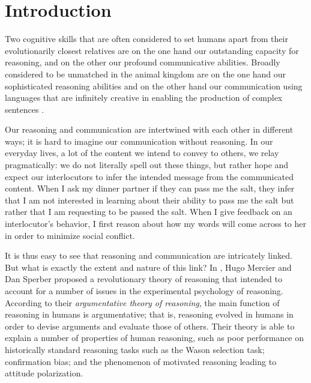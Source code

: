 \chapter*{Introduction}
\label{sec:introduction}


Two cognitive skills that are often considered to set humans apart from their evolutionarily closest relatives are on the one hand our outstanding capacity for reasoning, and on the other our profound communicative abilities.
Broadly considered to be unmatched in the animal kingdom are on the one hand
our sophisticated reasoning abilities
and
on the other hand
our communication using languages that are infinitely creative in enabling the production of complex sentences \citep{CheneySeyfarth98}.

Our reasoning and communication are intertwined with each other in different ways; it is hard to imagine our communication without reasoning. In our everyday lives, a lot of the content we intend to convey to others, we relay pragmatically: we do not literally spell out these things, but rather hope and expect our interlocutors to infer the intended message from the communicated content.
When I ask my dinner partner if they can pass me the salt, they infer that I am not interested in learning about their ability to pass me the salt but rather that I am requesting to be passed the salt.
When I give feedback on an interlocutor's behavior, I first reason about how my words will come across to her in order to minimize social conflict.

It is thus easy to see that reasoning and communication are intricately linked. But what is exactly the extent and nature of this link?
In \citeyear{MS11}, Hugo Mercier and Dan Sperber proposed a revolutionary theory of reasoning that intended to account for a number of issues in the experimental psychology of reasoning.
According to their \emph{argumentative theory of reasoning}, the main function of reasoning in humans is argumentative; that is, reasoning evolved in humans in order to devise arguments and evaluate those of others. Their theory is able to explain a number of properties of human reasoning, such as poor performance on historically standard reasoning tasks such as the Wason selection task;
confirmation bias; and the phenomenon of motivated reasoning leading to attitude polarization.

